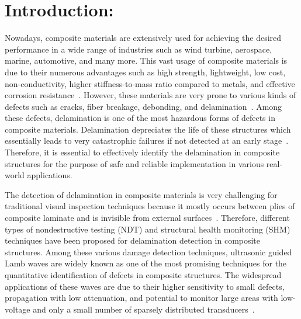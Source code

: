 \section{Introduction:}

Nowadays, composite materials are extensively used for achieving the desired performance in a wide range of industries such as wind turbine, aerospace, marine, automotive, and many more.
This vast usage of composite materials is due to their numerous advantages such as high strength, lightweight, low cost, non-conductivity, higher stiffness-to-mass ratio compared to metals, and effective corrosion resistance~\cite{baker2004composite, giurgiutiu2015structural, stoik2010nondestructive, poudel2015comparison}. 
However, these materials are very prone to various kinds of defects such as cracks, fiber breakage, debonding, and delamination~\cite{poudel2015comparison, heslehurst2014defects, talreja2012damage}.
Among these defects, delamination is one of the most hazardous forms of defects in composite materials. 
Delamination depreciates the life of these structures which essentially leads to very catastrophic failures if not detected at an early stage~\cite{talreja2012damage, wisnom2012role}.
Therefore, it is essential to effectively identify the delamination
in composite structures for the purpose of safe and reliable implementation in
various real-world applications.

The detection of delamination in composite materials is very challenging for traditional visual inspection techniques because it mostly occurs between plies of composite laminate and is invisible from external surfaces~\cite{guinard20023d, staszewski2009health, tuo2019damage}.
Therefore, different types of nondestructive testing (NDT) and structural health monitoring (SHM) techniques have been proposed for delamination detection in composite structures.
Among these various damage detection techniques, ultrasonic guided Lamb waves are widely known as one of the most promising techniques for the quantitative identification of defects in composite structures.
The widespread applications of these waves are due to their higher sensitivity to small defects, propagation with low attenuation, and potential to monitor large areas with low-voltage and only a small number of sparsely distributed transducers~\cite{alleyne1992interaction, mitra2016guided, giurgiutiu2003lamb, ihn2008pitch}.

